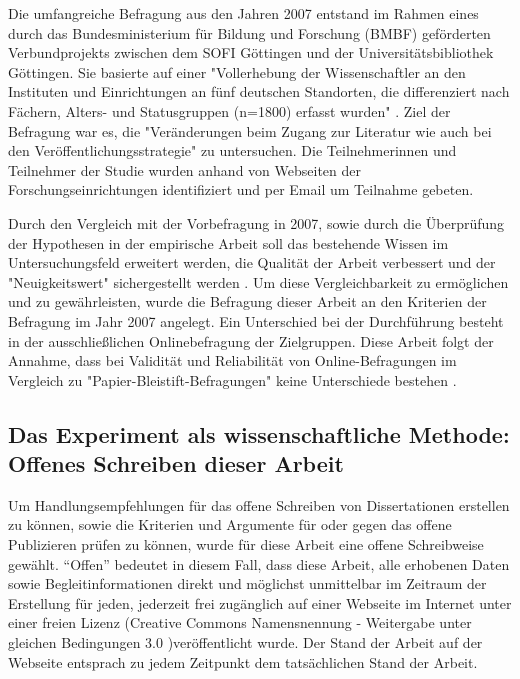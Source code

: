 Die umfangreiche Befragung aus den Jahren 2007 entstand im Rahmen eines durch das Bundesministerium für Bildung und Forschung (BMBF) geförderten Verbundprojekts zwischen dem SOFI Göttingen und der Universitätsbibliothek Göttingen. Sie basierte auf einer "Vollerhebung der Wissenschaftler an den Instituten und Einrichtungen an fünf deutschen Standorten, die differenziert nach Fächern, Alters- und Statusgruppen (n=1800) erfasst wurden" \cite{Hanekop_2014}. Ziel der Befragung war es, die "Veränderungen beim Zugang zur Literatur wie auch bei den Veröffentlichungsstrategie" \cite{Hanekop_Wittke_2007_Fragebogen} zu untersuchen. Die Teilnehmerinnen und Teilnehmer der Studie wurden anhand von Webseiten der Forschungseinrichtungen identifiziert und per Email um Teilnahme gebeten.

Durch den Vergleich mit der Vorbefragung in 2007, sowie durch die Überprüfung der Hypothesen in der empirische Arbeit soll das bestehende Wissen im Untersuchungsfeld erweitert werden, die Qualität der Arbeit verbessert und der "Neuigkeitswert" sichergestellt werden \cite{raab_2012_fragebogen}. Um diese Vergleichbarkeit zu ermöglichen und zu gewährleisten, wurde die Befragung dieser Arbeit an den Kriterien der Befragung im Jahr 2007 angelegt. Ein Unterschied bei der Durchführung besteht in der ausschließlichen Onlinebefragung der Zielgruppen. Diese Arbeit folgt der Annahme, dass bei Validität und Reliabilität von Online-Befragungen im Vergleich zu "Papier-Bleistift-Befragungen" keine Unterschiede bestehen \cite{Batinic_2013_onlinebefrag}.

\subsection{Das Experiment als wissenschaftliche Methode: Offenes Schreiben dieser Arbeit}

Um Handlungsempfehlungen für das offene Schreiben von Dissertationen erstellen zu können, sowie die Kriterien und Argumente für oder gegen das offene Publizieren prüfen zu können, wurde für diese Arbeit eine offene Schreibweise gewählt. “Offen” bedeutet in diesem Fall, dass diese Arbeit, alle erhobenen Daten sowie Begleitinformationen direkt und möglichst unmittelbar im Zeitraum der Erstellung für jeden, jederzeit frei zugänglich auf einer Webseite im Internet unter einer freien Lizenz (Creative Commons Namensnennung - Weitergabe unter gleichen Bedingungen 3.0 \cite{cc_by_sa_2008})veröffentlicht wurde. Der Stand der Arbeit auf der Webseite entsprach zu jedem Zeitpunkt dem tatsächlichen Stand der Arbeit.

